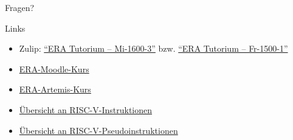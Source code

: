 \begin{frame}[c, fragile]{}{}
	\begin{center}
		\LARGE Fragen?
	\end{center}
\end{frame}

\begin{frame}[c, fragile]{Links}{}
	\begin{itemize}
		\item Zulip: \href{https://zulip.in.tum.de/#narrow/channel/3255-ERA-Tutorium-.E2.80.93-Mi-1600-3}{\enquote{ERA Tutorium -- Mi-1600-3}}
		      bzw. \href{https://zulip.in.tum.de/#narrow/channel/3264-ERA-Tutorium-.E2.80.93-Fr-1500-1}{\enquote{ERA Tutorium -- Fr-1500-1}}
		\item \href{https://www.moodle.tum.de/course/view.php?id=111440}{ERA-Moodle-Kurs}
		\item \href{https://artemis.tum.de/courses/516}{ERA-Artemis-Kurs}
		\item \href{https://msyksphinz-self.github.io/riscv-isadoc/html/index.html}{Übersicht an RISC-V-Instruktionen}
		\item \href{https://github.com/riscv-non-isa/riscv-asm-manual/blob/main/src/asm-manual.adoc#a-listing-of-standard-risc-v-pseudoinstructions}{Übersicht an RISC-V-Pseudoinstruktionen}
	\end{itemize}
\end{frame}

\maketitle


